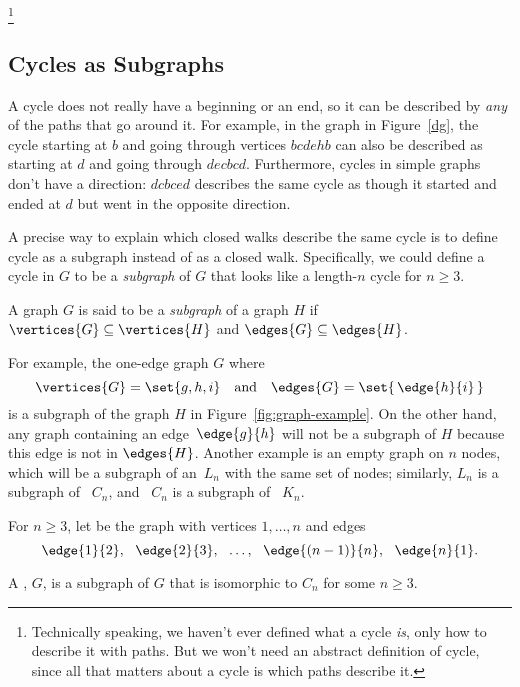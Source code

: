 \footnote{Technically speaking, we haven't ever defined what a cycle
\emph{is}, only how to describe it with paths.  But we won't need an
abstract definition of cycle, since all that matters about a cycle is which
paths describe it.}
\fi

\subsection{Cycles as Subgraphs}

A cycle does not really have a beginning or an end, so it can be
described by \emph{any} of the paths that go around it.  For example,
in the graph in Figure~\ref{dg}, the cycle starting at $b$ and going
through vertices $bcdehb$ can also be described as starting at $d$ and
going through $decbcd$.  Furthermore, cycles in simple graphs don't
have a direction: $dcbced$ describes the same cycle as though it
started and ended at $d$ but went in the opposite direction.

A precise way to explain which closed walks describe the same cycle is
to define cycle as a subgraph instead of as a closed walk.  Specifically, we
could define a cycle in $G$ to be a \emph{subgraph} of $G$ that looks
like a length-$n$ cycle for $n \ge 3$.

\begin{definition}\label{def:subgraph}
  A graph $G$ is said to be a \emph{subgraph} of a graph $H$ if
  $\vertices{G} \subseteq \vertices{H}$ and $\edges{G} \subseteq
  \edges{H}$.
\end{definition}

For example, the one-edge graph $G$ where
\begin{equation*}
   \vertices{G} = \set{ g, h, i } \quad \text{and}\quad  \edges{G} =
   \set{\, \edge{h}{i} \, }
\end{equation*}
is a subgraph of the graph $H$ in Figure~\ref{fig:graph-example}.  On the
other hand, any graph containing an edge~$\edge{g}{h}$ will not be a
subgraph of $H$ because this edge is not in $\edges{H}$.  Another example
is an empty graph on $n$ nodes, which will be a subgraph of an~$L_n$ with
the same set of nodes; similarly, $L_n$ is a subgraph of ~$C_n$, and ~$C_n$ is
a subgraph of ~$K_n$.

\begin{definition}
  For $n \ge 3$, let  be the graph with vertices $1,\dots, n$
  and edges
\[
\edge{1}{2},\ \ \edge{2}{3},\ \ \dots,\ \ \edge{(n-1)}{n},\ \ \edge{n}{1}.
\]

\iffalse
A graph is a \term{cycle} of length $n$ iff it is isomorphic to $C_n$
for some $n \ge 3$.
\fi

A , $G$, is a subgraph of $G$ that is
isomorphic to $C_n$ for some $n \ge 3$.
\end{definition}

